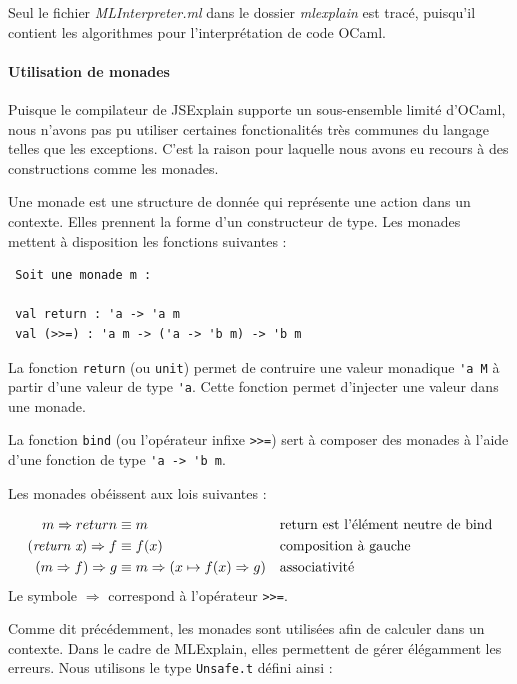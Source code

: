 \documentclass{easychair}
\begin{document}
Seul le fichier \emph{MLInterpreter.ml} dans le dossier \emph{mlexplain} est 
tracé, puisqu'il contient les algorithmes pour l'interprétation de code OCaml.

\paragraph{Utilisation de monades}
Puisque le compilateur de JSExplain supporte un sous-ensemble limité d'OCaml, 
nous n'avons pas pu utiliser certaines fonctionalités très communes du langage 
telles que les exceptions. C'est la raison pour laquelle nous avons eu recours 
à des constructions comme les monades.

Une monade est une structure de donnée qui représente une action dans un 
contexte. Elles prennent la forme d'un constructeur de type. Les monades 
mettent à disposition les fonctions suivantes :

\begin{verbatim}
 Soit une monade m :
 
 val return : 'a -> 'a m
 val (>>=) : 'a m -> ('a -> 'b m) -> 'b m
\end{verbatim}

La fonction \verb|return| (ou \verb|unit|) permet de contruire une valeur 
monadique \verb|'a M| à partir d'une valeur de type \verb|'a|. Cette fonction 
permet d'injecter une valeur dans une monade.

La fonction \verb|bind| (ou l'opérateur infixe \verb|>>=|) sert à composer des 
monades à l'aide d'une fonction de type \verb|'a -> 'b m|.


Les monades obéissent aux lois suivantes :

\begin{align*}
m \Rightarrow return &\equiv m && \text{return est l'élément neutre de bind} \\
(\textit{\mbox{return x}}) \Rightarrow f &\equiv f(x) && \text{composition à 
gauche} \\
(m \Rightarrow f) \Rightarrow g &\equiv m \Rightarrow (x \mapsto f(x) 
\Rightarrow g) && \text{associativité}
\end{align*}
Le symbole $\Rightarrow$ correspond à l'opérateur \verb|>>=|.

Comme dit précédemment, les monades sont utilisées afin de calculer dans un 
contexte. Dans le cadre de MLExplain, elles permettent de gérer élégamment les 
erreurs. Nous utilisons le type \verb|Unsafe.t| défini ainsi :
\end{document}
